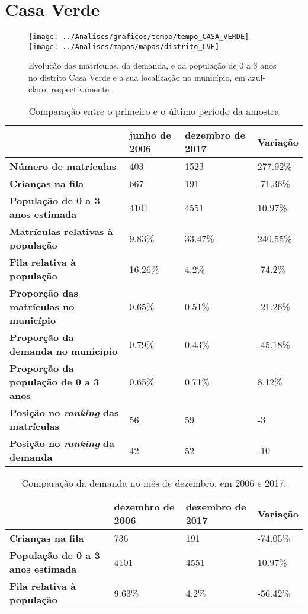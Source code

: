 \section{Casa Verde}
\begin{figure}[H]
\centering
\texttt{[image: ../Analises/graficos/tempo/tempo\_CASA\_VERDE]}
\texttt{[image: ../Analises/mapas/mapas/distrito\_CVE]}
\caption{Evolução das matrículas, da demanda, e da população de 0 a 3 anos no distrito Casa Verde e a sua localização no município, em azul-claro, respectivamente.}
\end{figure}
\begin{table}[H]
\begin{tabular}{l|l|l|l}
\textbf{}                                      & \textbf{junho de 2006}       & \textbf{dezembro de 2017}    & \textbf{Variação} \\ \hline
\textbf{Número de matrículas}                  & 403 & 1523 & 277.92\% \\ \hline
\textbf{Crianças na fila}                      & 667 & 191 & -71.36\% \\ \hline
\textbf{População de 0 a 3 anos estimada}      & 4101 & 4551 & 10.97\% \\ \hline
\textbf{Matrículas relativas à população}      & 9.83\% & 33.47\% & 240.55\% \\ \hline
\textbf{Fila relativa à população}             & 16.26\% & 4.2\% & -74.2\% \\ \hline
\textbf{Proporção das matrículas no município} & 0.65\% & 0.51\% & -21.26\% \\ \hline
\textbf{Proporção da demanda no município}     & 0.79\% & 0.43\% & -45.18\% \\ \hline
\textbf{Proporção da população de 0 a 3 anos}  & 0.65\% & 0.71\% & 8.12\% \\ \hline
\textbf{Posição no \textit{ranking} das matrículas}     & 56 & 59 & -3 \\ \hline
\textbf{Posição no \textit{ranking} da demanda}         & 42 & 52 & -10 \\ 
\end{tabular}
\caption{Comparação entre o primeiro e o último período da amostra}
\end{table}
\begin{table}[H]
\begin{tabular}{l|l|l|l}
\textbf{}                                 & \textbf{dezembro de 2006} & \textbf{dezembro de 2017} & \textbf{Variação} \\ \hline
\textbf{Crianças na fila}                      & 736 & 191 & -74.05\% \\ \hline
\textbf{População de 0 a 3 anos estimada}      & 4101 & 4551 & 10.97\% \\ \hline
\textbf{Fila relativa à população}             & 9.63\% & 4.2\% & -56.42\% \\
\end{tabular}
\caption{Comparação da demanda no mês de dezembro, em 2006 e 2017.}
\end{table}
